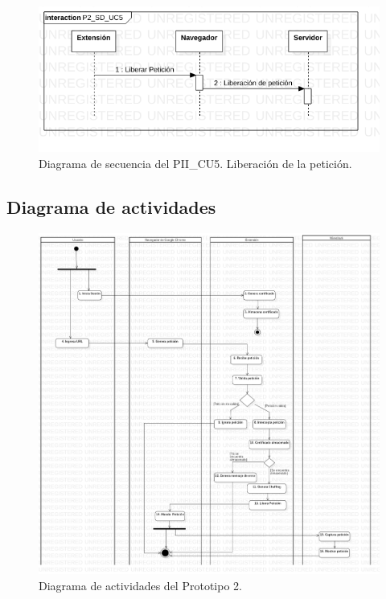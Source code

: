 \documentclass[12pt, a4paper, titlepage]{report}
\begin{document}
    			\begin{figure}[H]
    				\begin{center}    		    	\includegraphics[width=15cm]{./imagenes/Desarrollo/Prototipo_2/P2_SD_UC5.png}
    				\caption[Diagrama de secuencia 5 del Prototipo II]{Diagrama de secuencia del PII\_CU5. Liberación de la petición.}
    				\end{center}
    			\end{figure}
    		
    		
    		\subsection{Diagrama de actividades}
    		    \begin{figure}[H]
    				\begin{center}	\includegraphics[width=15cm]{./imagenes/Desarrollo/Prototipo_2/DA_P2.png}
    					\caption{Diagrama de actividades del Prototipo 2.}
    				\end{center}
    			\end{figure}
    		
\end{document}
